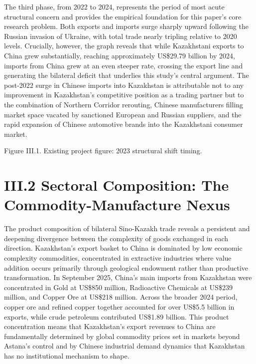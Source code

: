 \documentclass[12pt]{article}
\begin{document}
The third phase, from 2022 to 2024, represents the period of most acute structural concern and provides the empirical foundation for this paper's core research problem. Both exports and imports surge sharply upward following the Russian invasion of Ukraine, with total trade nearly tripling relative to 2020 levels. Crucially, however, the graph reveals that while Kazakhstani exports to China grew substantially, reaching approximately US\$29.79 billion by 2024, imports from China grew at an even steeper rate, crossing the export line and generating the bilateral deficit that underlies this study's central argument. The post-2022 surge in Chinese imports into Kazakhstan is attributable not to any improvement in Kazakhstan's competitive position as a trading partner but to the combination of Northern Corridor rerouting, Chinese manufacturers filling market space vacated by sanctioned European and Russian suppliers, and the rapid expansion of Chinese automotive brands into the Kazakhstani consumer market.\par

Figure III.1. Existing project figure: 2023 structural shift timing.\par

\section{III.2 Sectoral Composition: The Commodity-Manufacture Nexus}

The product composition of bilateral Sino-Kazakh trade reveals a persistent and deepening divergence between the complexity of goods exchanged in each direction. Kazakhstan's export basket to China is dominated by low economic complexity commodities, concentrated in extractive industries where value addition occurs primarily through geological endowment rather than productive transformation. In September 2025, China's main imports from Kazakhstan were concentrated in Gold at US\$850 million, Radioactive Chemicals at US\$239 million, and Copper Ore at US\$218 million. Across the broader 2024 period, copper ore and refined copper together accounted for over US\$5.5 billion in exports, while crude petroleum contributed US\$1.89 billion. This product concentration means that Kazakhstan's export revenues to China are fundamentally determined by global commodity prices set in markets beyond Astana's control and by Chinese industrial demand dynamics that Kazakhstan has no institutional mechanism to shape.\par
\end{document}
